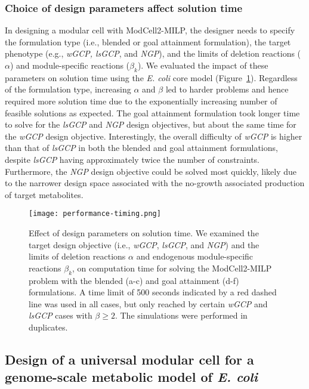 \subsubsection{Choice of design parameters affect solution time}
In designing a modular cell with ModCell2-MILP, the designer needs to specify the formulation type (i.e., blended or goal attainment formulation), the target phenotype (e.g., \textit{wGCP, lsGCP}, and \textit{NGP}), and the limits of deletion reactions ($\alpha$) and module-specific reactions ($\beta_{k}$). We evaluated the impact of these parameters on solution time using the \textit{E. coli} core model (Figure~\ref{fig5:times}).  Regardless of the formulation type, increasing $\alpha$ and $\beta$ led to harder problems and hence required more solution time due to the exponentially increasing number of feasible solutions as expected. The goal attainment formulation took longer time to solve for the \textit{lsGCP} and \textit{NGP} design objectives, but about the same time for the \textit{wGCP} design objective. Interestingly, the overall difficulty of \textit{wGCP} is higher than that of \textit{lsGCP} in both the blended and goal attainment formulations, despite \textit{lsGCP} having approximately twice the number of constraints. Furthermore, the \textit{NGP} design objective could be solved most quickly, likely due to the narrower design space associated with the no-growth associated production of target metabolites.

\begin{figure}[hp]
    \centering
    \texttt{[image: performance-timing.png]}
    \caption[Effect of design parameters on solution time]{Effect of design parameters on solution time. We examined the target design objective (i.e., \textit{wGCP}, \textit{lsGCP}, and \textit{NGP}) and the limits of deletion reactions $\alpha$ and endogenous module-specific reactions $\beta_k$, on computation time for solving the ModCell2-MILP problem with the blended (a-c) and goal attainment (d-f) formulations. A time limit of 500 seconds indicated by a red dashed line was used in all cases, but only reached by certain \textit{wGCP} and \textit{lsGCP} cases with $\beta \ge2$. The simulations were performed in duplicates.}
    \label{fig5:times}
\end{figure}

\subsection{Design of a universal modular cell for a genome-scale metabolic model of \textit{E. coli}} \label{sec:univ_design}

